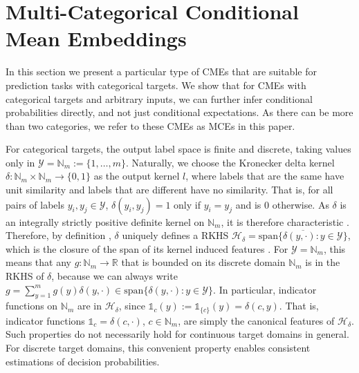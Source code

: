 \documentclass{llncs}
\begin{document}
	\section{Multi-Categorical Conditional Mean Embeddings}
	\label{sec:multiclass_conditional_embedding}
	
	In this section we present a particular type of \glspl{CME} that are suitable for prediction tasks with categorical targets. We show that for \glspl{CME} with categorical targets and arbitrary inputs, we can further infer conditional probabilities directly, and not just conditional expectations. As there can be more than two categories, we refer to these \glspl{CME} as \glspl{MCE} in this paper.
	
	For categorical targets, the output label space is finite and discrete, taking values only in $\mathcal{Y} = \mathbb{N}_{m} := \{1, \dots, m\}$. Naturally, we choose the Kronecker delta kernel $\delta : \mathbb{N}_{m} \times \mathbb{N}_{m} \to \{0, 1\}$ as the output kernel $l$, where labels that are the same have unit similarity and labels that are different have no similarity. That is, for all pairs of labels $y_{i}, y_{j} \in \mathcal{Y}$, $\delta(y_{i}, y_{j}) = 1$ only if $y_{i} = y_{j}$ and is $0$ otherwise. As $\delta$ is an integrally strictly positive definite kernel on $\mathbb{N}_{m}$, it is therefore characteristic \citep[Theorem 7]{sriperumbudur2010hilbert}. Therefore, by definition \citep{fukumizu2004dimensionality}, $\delta$ uniquely defines a \gls{RKHS}  $\mathcal{H}_{\delta} = \overline{\mathrm{span}\{\delta(y, \cdot) : y \in \mathcal{Y}\}}$, which is the closure of the span of its kernel induced features \citep{xu2009refinement}. For $\mathcal{Y} = \mathbb{N}_{m}$, this means that any $g : \mathbb{N}_{m} \to \mathbb{R}$ that is bounded on its discrete domain $\mathbb{N}_{m}$ is in the \gls{RKHS} of $\delta$, because we can always write $g = \sum_{y = 1}^{m} g(y) \delta(y, \cdot) \in \mathrm{span}\{\delta(y, \cdot) : y \in \mathcal{Y}\}$. In particular, indicator functions on $\mathbb{N}_{m}$ are in $\mathcal{H}_{\delta}$, since $\mathbb{1}_{c}(y) := \mathbb{1}_{\{c\}}(y) = \delta(c, y)$.
	That is, indicator functions $\mathbb{1}_{c} = \delta(c, \cdot)$, $c \in \mathbb{N}_{m}$, are simply the canonical features of $\mathcal{H}_{\delta}$. Such properties do not necessarily hold for continuous target domains in general. For discrete target domains, this convenient property enables consistent estimations of decision probabilities.
	
\end{document}
